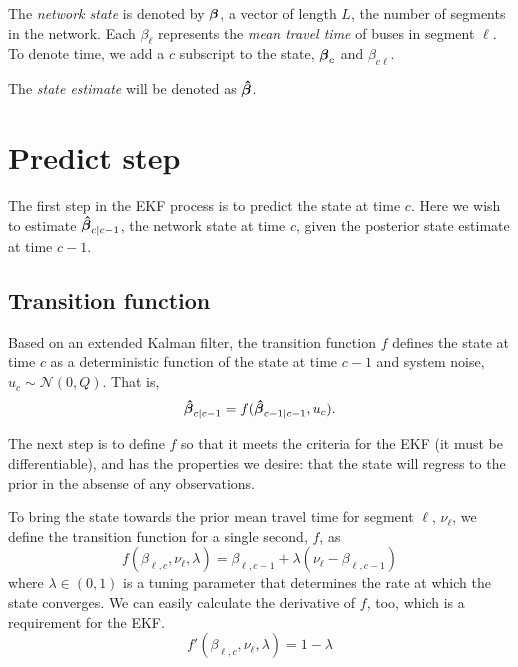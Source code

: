 \documentclass[english]{MastersDoctoralThesis}\usepackage[]{graphicx}\usepackage[]{color}
\begin{document}


The \emph{network state} is denoted by $\boldsymbol\beta$,
a vector of length $L$, the number of segments in the network.
Each $\beta_\ell$ represents the \emph{mean travel time} of buses
in segment $\ell$.
To denote time, we add a $c$ subscript to the state, $\boldsymbol\beta_c$
and $\beta_{c\ell}$.

The \emph{state estimate} will be denoted as $\boldsymbol{\hat\beta}$.

\section{Predict step}

The first step in the EKF process is to predict the state at time $c$.
Here we wish to estimate $\boldsymbol{\hat\beta}_{c|c-1}$, the network state at time $c$,
given the posterior state estimate at time $c-1$.

\subsection{Transition function}

Based on an extended Kalman filter,
the transition function $f$ defines the state at time $c$
as a deterministic function of the state at time $c-1$
and system noise, $u_c \sim \mathcal{N}(0, Q)$.
That is,
\begin{equation}
    \label{eq:kf_transition_basic}
    \boldsymbol{\hat\beta}_{c|c-1} = f(\boldsymbol{\hat\beta}_{c-1|c-1}, u_c).
\end{equation}

The next step is to define $f$ so that it meets the criteria for
the EKF (it must be differentiable), and has the properties we desire:
that the state will regress to the prior in the absense of any observations.

To bring the state towards the prior mean travel time for segment $\ell$,
$\nu_\ell$, we define the transition function for a single second, $f$, as
\begin{equation}
    \label{eq:kf_transition_def}
    f(\beta_{\ell,c}, \nu_\ell, \lambda) = \beta_{\ell,c-1} + \lambda (\nu_\ell - \beta_{\ell,c-1})
\end{equation}
where $\lambda \in (0,1)$ is a tuning parameter that determines the rate at which
the state converges.
We can easily calculate the derivative of $f$, too, which is a requirement for the EKF.
\begin{equation}
    \label{eq:kf_transition_fderiv}
    f'(\beta_{\ell,c}, \nu_\ell, \lambda) = 1 - \lambda
\end{equation}
\end{document}
